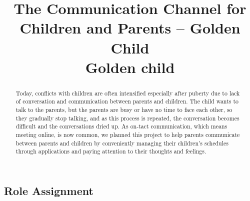 \documentclass[conference]{IEEEtran}
\begin{document}
\title{The Communication Channel for Children and Parents – Golden Child\\
{\footnotesize Golden child}
}

\author{
\and
{}
\and
{}
\and
{}
}

\maketitle

\begin{abstract}
  Today, conflicts with children are often intensified especially after puberty due to lack of conversation and communication between parents and children. The child wants to talk to the parents, but the parents are busy or have no time to face each other, so they gradually stop talking, and as this process is repeated, the conversation becomes difficult and the conversations dried up. As on-tact communication, which means meeting online, is now common, we planned this project to help parents communicate between parents and children by conveniently managing their children's schedules through applications and paying attention to their thoughts and feelings.
\end{abstract}

\subsection{Role Assignment}
\end{document}
